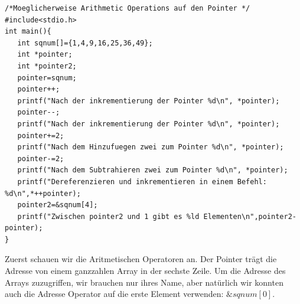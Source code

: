 \begin{lstlisting}
/*Moeglicherweise Arithmetic Operations auf den Pointer */
#include<stdio.h>
int main(){
   int sqnum[]={1,4,9,16,25,36,49};
   int *pointer;
   int *pointer2;
   pointer=sqnum;
   pointer++;
   printf("Nach der inkrementierung der Pointer %d\n", *pointer);
   pointer--;
   printf("Nach der inkrementierung der Pointer %d\n", *pointer);
   pointer+=2;
   printf("Nach dem Hinzufuegen zwei zum Pointer %d\n", *pointer);
   pointer-=2;
   printf("Nach dem Subtrahieren zwei zum Pointer %d\n", *pointer);   
   printf("Dereferenzieren und inkrementieren in einem Befehl: %d\n",*++pointer);
   pointer2=&sqnum[4];
   printf("Zwischen pointer2 und 1 gibt es %ld Elementen\n",pointer2-pointer);
}
\end{lstlisting}
Zuerst schauen wir die Aritmetischen Operatoren an. Der Pointer trägt die Adresse von einem 
ganzzahlen Array in der sechste Zeile. Um die Adresse des Arrays zuzugriffen, wir brauchen nur ihres Name, aber 
natürlich wir konnten auch die Adresse Operator auf die erste Element verwenden: $\&sqnum[0]$.

